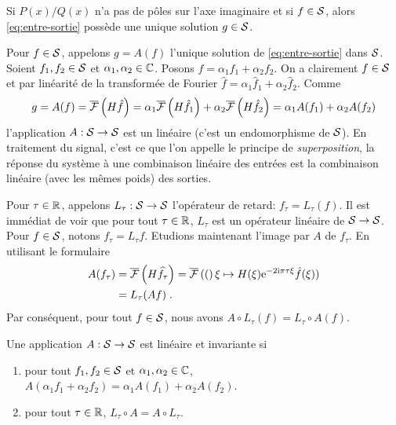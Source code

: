 \begin{proposition}
\label{prop:unicite-mcs}
 Si $P(x)/Q(x)$ n'a pas de p\^oles sur l'axe imaginaire et si $f \in \mathcal{S}$, alors \eqref{eq:entre-sortie} poss\`ede une unique solution $g\in \mathcal{S}$.
\end{proposition}
Pour $f \in \mathcal{S}$, appelons $g= A(f)$ l'unique solution de \eqref{eq:entre-sortie} dans $\mathcal{S}$. Soient $f_1,f_2 \in \mathcal{S}$ et $\alpha_1,\alpha_2 \in \mathbb{C}$. Posons $f= \alpha_1 f_1+ \alpha_2 f_2$. On a clairement $f \in \mathcal{S}$ et par lin\'{e}arit\'{e} de la transform\'{e}e de Fourier $\hat{f}= \alpha_1 \hat{f}_1 + \alpha_2 \hat{f}_2$. Comme
$$
g= A(f)= \overline{\mathcal{F}}\left(  H \hat{f} \right) = \alpha_1 \overline{\mathcal{F}}\left(  H \hat{f}_1 \right) + \alpha_2 \overline{\mathcal{F}}\left(  H \hat{f}_2 \right) = \alpha_1 A(f_1) + \alpha_2 A(f_2)
$$
l'application $A: \mathcal{S} \to \mathcal{S}$ est un lin\'{e}aire (c'est un endomorphisme de $\mathcal{S}$). En traitement du signal, c'est ce que l'on appelle le principe de \emph{superposition}, la r\'{e}ponse du syst\`{e}me \`{a} une combinaison lin\'{e}aire des entr\'{e}es est la combinaison lin\'{e}aire (avec les m\^{e}mes poids) des sorties.

Pour $\tau \in \mathbb{R}$, appelons $L_\tau: \mathcal{S} \to \mathcal{S}$ l'op\'{e}rateur de retard: $f_\tau = L_\tau(f)$. Il est imm\'{e}diat de voir que pour tout $\tau \in \mathbb{R}$, $L_\tau$ est un op\'{e}rateur lin\'{e}aire de $\mathcal{S} \to \mathcal{S}$. Pour $f \in \mathcal{S}$, notons $f_\tau = L_\tau f$. Etudions maintenant l'image par $A$ de $f_\tau$. En utilisant le formulaire 
\begin{align*}
A( f_\tau)
&= \overline{\mathcal{F}}\left( H \widehat{f_\tau} \right) = \overline{\mathcal{F}}\left( ( \right) \xi \mapsto H(\xi) \mathrm{e}^{-2 \mathrm{i} \pi \tau \xi} \hat{f}(\xi)) \\
&= L_\tau( A f) \;.
\end{align*}
Par cons\'{e}quent, pour tout $f \in \mathcal{S}$, nous avons $A \circ L_\tau (f)= L_\tau \circ A (f)$.
\begin{definition}
\label{def:lineaire-invariance}
Une application $A: \mathcal{S} \to \mathcal{S}$ est lin\'{e}aire et invariante si
\begin{enumerate}[label=(\roman*)]
\item pour tout $f_1,f_2 \in \mathcal{S}$ et $\alpha_1,\alpha_2 \in \mathbb{C}$, $A(\alpha_1 f_1 + \alpha_2 f_2)= \alpha_1 A(f_1) + \alpha_2 A(f_2) $.
\item pour tout $\tau \in \mathbb{R}$, $L_\tau \circ A= A \circ L_\tau$.
\end{enumerate}
\end{definition} 